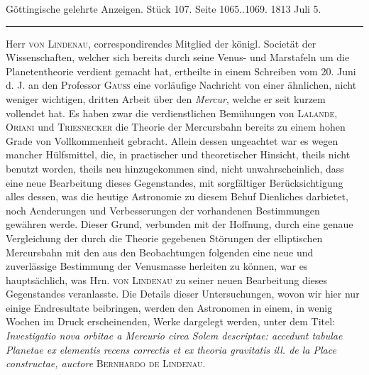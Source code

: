 \clearpage
{}
\begin{center}\small Göttingische gelehrte Anzeigen. Stück 107. Seite 1065..1069. 1813 Juli 5.\\[3pt]\rule{.72\linewidth}{.3pt}\end{center}

Herr \textsc{von Lindenau}, correspondirendes Mitglied der königl. Societät der Wissenschaften, welcher sich bereits durch seine Venus- und Marstafeln um die Planetentheorie verdient gemacht hat, ertheilte in einem Schreiben vom 20. Juni d. J. an den Professor \textsc{Gauss} eine vorläufige Nachricht von einer ähnlichen, nicht weniger wichtigen, dritten Arbeit über den \emph{Mercur}, welche er seit kurzem vollendet hat. Es haben zwar die verdienstlichen Bemühungen von \textsc{Lalande}, \textsc{Oriani} und \textsc{Triesnecker} die Theorie der Mercursbahn bereits zu einem hohen Grade von Vollkommenheit gebracht. Allein dessen ungeachtet war es wegen mancher Hülfsmittel, die, in practischer und theoretischer Hinsicht, theils nicht benutzt worden, theils neu hinzugekommen sind, nicht unwahrscheinlich, dass eine neue Bearbeitung dieses Gegenstandes, mit sorgfältiger Berücksichtigung alles dessen, was die heutige Astronomie zu diesem Behuf Dienliches darbietet, noch Aenderungen und Verbesserungen der vorhandenen Bestimmungen gewähren werde. Dieser Grund, verbunden mit der Hoffnung, durch eine genaue Vergleichung der durch die Theorie gegebenen Störungen der elliptischen Mercursbahn mit den aus den Beobachtungen folgenden eine neue und zuverlässige Bestimmung der Venusmasse herleiten zu können, war es hauptsächlich, was Hrn. \textsc{von Lindenau} zu seiner neuen Bearbeitung dieses Gegenstandes veranlasste. Die Details dieser Untersuchungen, wovon wir hier nur einige Endresultate beibringen, werden den Astronomen in einem, in wenig Wochen im Druck erscheinenden, Werke dargelegt werden, unter dem Titel: \emph{Investigatio nova orbitae a Mercurio circa Solem descriptae: accedunt tabulae Planetae ex elementis recens correctis et ex theoria gravitatis ill. de la Place constructae, auctore} \textsc{Bernhardo de Lindenau}.

